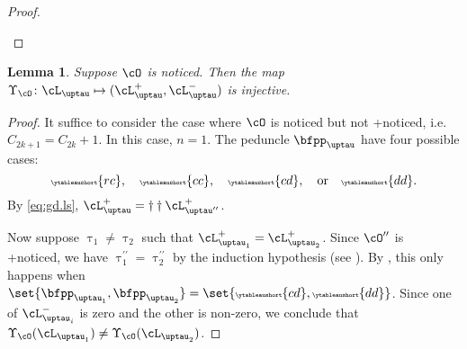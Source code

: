\documentclass[12pt,a4paper]{amsart}
\def\eDD{\overline{\nabla}}
\numberwithin{equation}{section}
\newtheorem{lem}[thm]{Lemma}
\theoremstyle{remark}
\let\ytb=\ytableaushort
\newcommand{\tytb}[1]{{\tiny\ytb{#1}}}
\def\cOpp{\cO^{\prime\prime}}
\def\pcL{\cL^+}
\def\ncL{\cL^-}
\def\uptaupp{\uptau^{\prime\prime}}
\begin{document}
\begin{proof}
\begin{enumPF}
    \end{enumPF}
\end{proof}


\begin{lem}\label{c:gd.noticed.inj}
  Suppose $\cO$ is noticed. Then the map $\Upsilon_{\cO}\colon \cL_{\uptau}\mapsto (\pcL_{\uptau},\ncL_{\uptau})$ is injective.
\end{lem}
\begin{proof}
  It suffice to consider the case where $\cO$ is noticed but not +noticed, i.e.
  $C_{2k+1}=C_{2k}+1$. In this case, $n=1$.
  The peduncle $\bfpp_{\uptau}$ have four possible cases:
  \[
    \tytb{rc}, \quad \tytb{cc}, \quad \tytb{cd},\quad \text{or}\quad  \tytb{dd}.
  \]
  By \eqref{eq:gd.ls}, $\pcL_{\uptau} = \dagger\dagger\pcL_{\uptaupp}$.

  Now suppose $\uptau_{1}\neq \uptau_{2}$ such that
  $\pcL_{\uptau_{1}}=\pcL_{\uptau_{2}}$.
  Since $\cOpp$ is +noticed, we have $\uptaupp_{1}=\uptaupp_{2}$ by the induction
  hypothesis (see ).
  By , this only happens when
  $\set{\bfpp_{\uptau_{1}},\bfpp_{\uptau_{2}}}=\set{\tytb{cd},\tytb{dd}}$.
  Since one of $\ncL_{\uptau_{i}}$ is zero and the other is non-zero, we
  conclude that $\Upsilon_{\cO}(\cL_{\uptau_{1}})\neq \Upsilon_{\cO}(\cL_{\uptau_{2}})$.
\end{proof}
\end{document}
